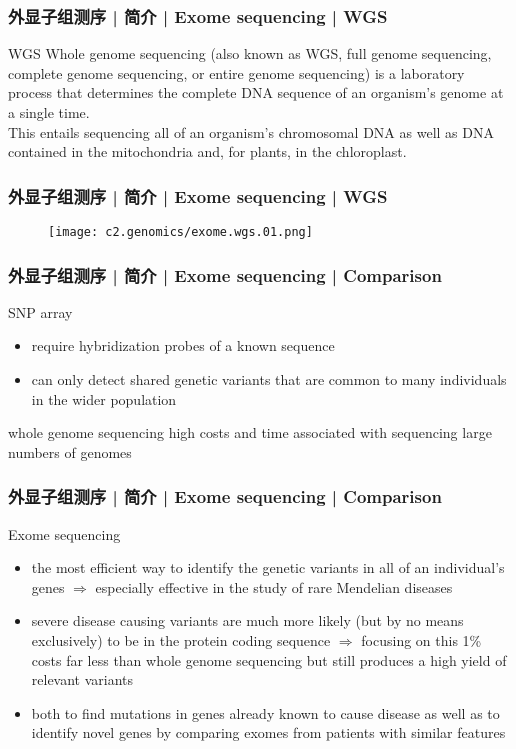 \begin{frame}
  \frametitle{外显子组测序 | 简介 | Exome sequencing | WGS}
  \begin{block}{WGS}
    Whole genome sequencing (also known as WGS, full genome sequencing, complete genome sequencing, or entire genome sequencing) is a laboratory process that determines the complete DNA sequence of an organism's genome at a single time.\\
    \vspace{1em}
    This entails sequencing all of an organism's chromosomal DNA as well as DNA contained in the mitochondria and, for plants, in the chloroplast.
  \end{block}
\end{frame}

\begin{frame}
  \frametitle{外显子组测序 | 简介 | Exome sequencing | WGS}
  \begin{figure}
    \centering
    \texttt{[image: c2.genomics/exome.wgs.01.png]}
  \end{figure}
\end{frame}

\begin{frame}
  \frametitle{外显子组测序 | 简介 | Exome sequencing | Comparison}
  \begin{block}{SNP array}
    \begin{itemize}
      \item require hybridization probes of a known sequence
      \item can only detect shared genetic variants that are common to many individuals in the wider population 
    \end{itemize}
  \end{block}
  \pause
  \begin{block}{whole genome sequencing}
    high costs and time associated with sequencing large numbers of genomes
  \end{block}
\end{frame}

\begin{frame}
  \frametitle{外显子组测序 | 简介 | Exome sequencing | Comparison}
  \begin{block}{Exome sequencing}
    \begin{itemize}
      \item the most efficient way to identify the genetic variants in all of an individual's genes $\Rightarrow$ especially effective in the study of rare Mendelian diseases
      \item severe disease causing variants are much more likely (but by no means exclusively) to be in the protein coding sequence $\Rightarrow$ focusing on this 1\% costs far less than whole genome sequencing but still produces a high yield of relevant variants
      \item both to find mutations in genes already known to cause disease as well as to identify novel genes by comparing exomes from patients with similar features
    \end{itemize}
  \end{block}
\end{frame}

